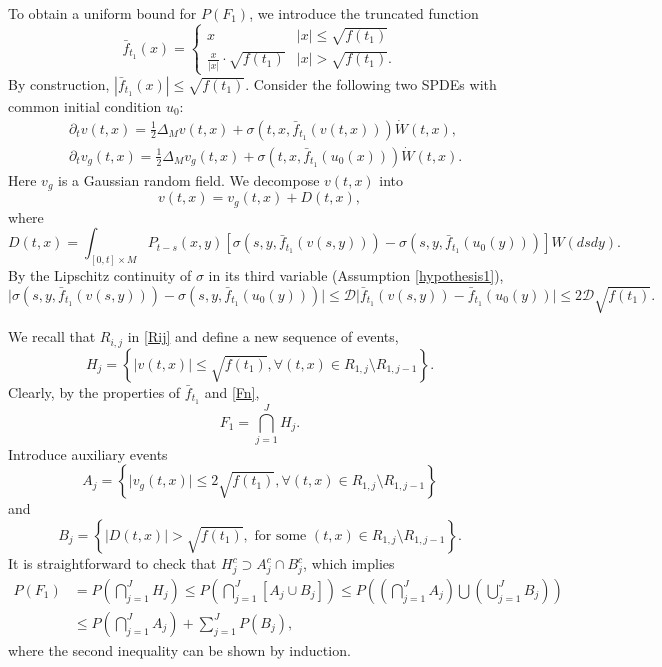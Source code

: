 \documentclass[12pt]{amsart}
\numberwithin{equation}{section}
\newcommand{\1}{\mathbf{1}}
\begin{document}
To obtain a uniform bound for $P(F_1)$, we introduce the truncated function
\[\bar{f}_{t_1}(x)=\begin{cases}
x & \vert x\vert\leq \sqrt{f(t_1)}\\
\frac{x}{\vert x\vert}\cdot \sqrt{f(t_1)} & \vert x\vert> \sqrt{f(t_1)}.
\end{cases}\]
By construction, $|\bar{f}_{t_1}(x)|\leq \sqrt{f(t_1)}$. Consider the following two SPDEs with common initial condition $u_0$:
\begin{equation}
\begin{split}
\label{shef}
&\partial_tv(t,x)=\frac{1}{2}\Delta_Mv(t,x)+\sigma(t,x,\bar{f}_{t_1}(v(t,x))) \dot{W}(t,x),\\
&\partial_tv_g(t,x)=\frac{1}{2}\Delta_Mv_g(t,x)+\sigma(t,x,\bar{f}_{t_1}(u_0(x))) \dot{W}(t,x).
\end{split}
\end{equation}
Here $v_g$ is a Gaussian random field. We decompose $v(t,x)$ into
\[v(t,x)=v_g(t,x)+D(t,x),\]
where
\[D(t,x)=\int_{[0,t]\times M} P_{t-s}(x,y)[\sigma(s,y,\bar{f}_{t_1}(v(s,y)))-\sigma(s,y,\bar{f}_{t_1}(u_0(y)))]W(dsdy).\]
By the Lipschitz continuity of $\sigma$ in its third variable (Assumption \eqref{hypothesis1}),
\begin{equation}
\label{sigmadiff1}
\vert \sigma(s,y,\bar{f}_{t_1}(v(s,y)))-\sigma(s,y,\bar{f}_{t_1}(u_0(y)))\vert\leq \mathcal{D}\vert \bar{f}_{t_1}(v(s,y))-\bar{f}_{t_1}(u_0(y))\vert\leq 2\mathcal{D}\sqrt{f(t_1)}.
\end{equation}

We recall that $R_{i,j}$ in \eqref{Rij} and define a new sequence of events,
\[H_j=\left\lbrace\vert v(t,x)\vert\leq \sqrt{f(t_1)},\forall (t,x)\in R_{1,j}\setminus R_{1,j-1}\right\rbrace.\]
Clearly, by the properties of $\bar f_{t_1}$ and \eqref{Fn},
\[F_{1}=\bigcap_{j=1}^{J}H_j.\]
Introduce auxiliary events
\[A_j=\left\lbrace\vert v_g(t,x)\vert\leq 2\sqrt{f(t_1)},\forall (t,x)\in R_{1,j}\setminus R_{1,j-1}\right\rbrace\]
and
\[B_j=\left\lbrace\vert D(t,x)\vert>\sqrt{f(t_1)}, \text{~for some~}(t,x)\in R_{1,j}\setminus R_{1,j-1}\right\rbrace.\]
It is straightforward to check that $H_j^c\supset A_j^c\cap B_j^c$, which implies
\begin{equation}
\label{sumprob}
\begin{split}
P(F_{1})&= P\left(\bigcap_{j=1}^{J}H_j\right)\leq P\left(\bigcap_{j=1}^{J}[A_j\cup B_j]\right)\leq P\left(\left(\bigcap_{j=1}^{J}A_j\right)\bigcup\left(\bigcup_{j=1}^{J}B_j\right)\right)\\
&\leq P\left(\bigcap_{j=1}^{J}A_j\right)+\sum_{j=1}^{J} P(B_j),
\end{split}
\end{equation}
where the second inequality can be shown by induction. 
\end{document}
